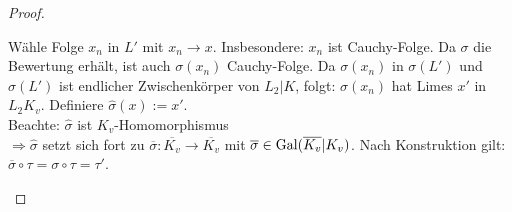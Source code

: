 \begin{proof}
\begin{enumerate}[i)]
 Wähle Folge $x_n$ in $L'$ mit $x_n \to x$. Insbesondere: $x_n$ ist Cauchy-Folge. Da $\sigma$ die Bewertung erhält, ist auch $\sigma(x_n)$ Cauchy-Folge. Da $\sigma(x_n)$ in $\sigma(L')$ und $\sigma(L')$ ist endlicher Zwischenkörper von $L_2 | K$, folgt: $\sigma(x_n)$ hat Limes $x'$ in $L_2 K_v$. Definiere $\hat{\sigma}(x):=x'$.\\
 Beachte: $\hat{\sigma}$ ist $K_v$-Homomorphismus\\
 $\Rightarrow \hat{\sigma}$ setzt sich fort zu $\overline{\sigma}: \overline{K_v} \to \overline{K_v}$ mit $\overline{\sigma} \in \operatorname{Gal}(\overline{K_v} | K_v)$. Nach Konstruktion gilt: $\overline{\sigma} \circ \tau = \sigma \circ \tau = \tau'$.
\end{enumerate}
\end{proof}